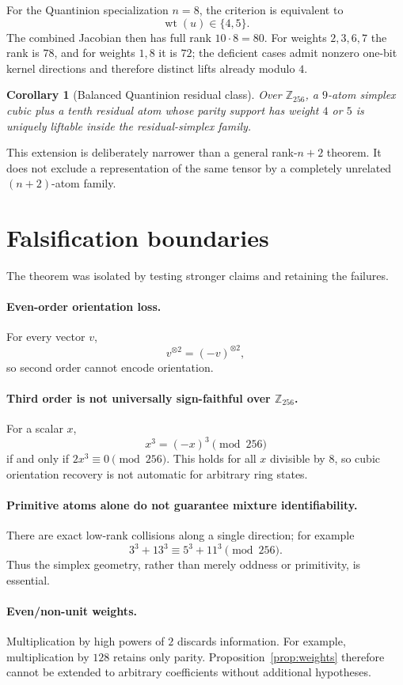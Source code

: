 \documentclass[11pt]{article}
\newtheorem{corollary}[theorem]{Corollary}
\theoremstyle{definition}
\newcommand{\Z}{\mathbb{Z}}
\begin{document}
For the Quantinion specialization $n=8$, the criterion is equivalent to
\[
\operatorname{wt}(u)\in\{4,5\}.
\]
The combined Jacobian then has full rank $10\cdot8=80$. For weights $2,3,6,7$ the rank is $78$, and for weights $1,8$ it is $72$; the deficient cases admit nonzero one-bit kernel directions and therefore distinct lifts already modulo $4$.

\begin{corollary}[Balanced Quantinion residual class]
Over $\Z_{256}$, a $9$-atom simplex cubic plus a tenth residual atom whose parity support has weight $4$ or $5$ is uniquely liftable inside the residual-simplex family.
\end{corollary}

This extension is deliberately narrower than a general rank-$n+2$ theorem. It does not exclude a representation of the same tensor by a completely unrelated $(n+2)$-atom family.

\section{Falsification boundaries}
The theorem was isolated by testing stronger claims and retaining the failures.

\paragraph{Even-order orientation loss.}
For every vector $v$,
\[
v^{\otimes2}=(-v)^{\otimes2},
\]
so second order cannot encode orientation.

\paragraph{Third order is not universally sign-faithful over $\Z_{256}$.}
For a scalar $x$,
\[
x^3=(-x)^3\pmod{256}
\]
if and only if $2x^3\equiv0\pmod{256}$. This holds for all $x$ divisible by $8$, so cubic orientation recovery is not automatic for arbitrary ring states.

\paragraph{Primitive atoms alone do not guarantee mixture identifiability.}
There are exact low-rank collisions along a single direction; for example
\[
3^3+13^3\equiv5^3+11^3\pmod{256}.
\]
Thus the simplex geometry, rather than merely oddness or primitivity, is essential.

\paragraph{Even/non-unit weights.}
Multiplication by high powers of $2$ discards information. For example, multiplication by $128$ retains only parity. Proposition~\ref{prop:weights} therefore cannot be extended to arbitrary coefficients without additional hypotheses.
\end{document}

